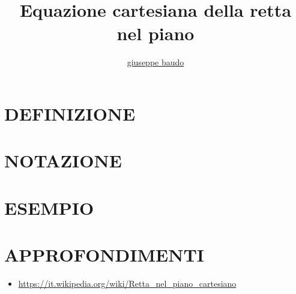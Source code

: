 \documentclass[a4paper,10pt]{article}
\title{Equazione cartesiana della retta nel piano}
\author{\href{http://www.baudo.hol.es}{giuseppe baudo}}
\begin{document}
\maketitle

\section{DEFINIZIONE}

\section{NOTAZIONE}

\section{ESEMPIO}

\section{APPROFONDIMENTI}
\begin{itemize}
 \item \url{https://it.wikipedia.org/wiki/Retta_nel_piano_cartesiano}
\end{itemize}
\end{document}

